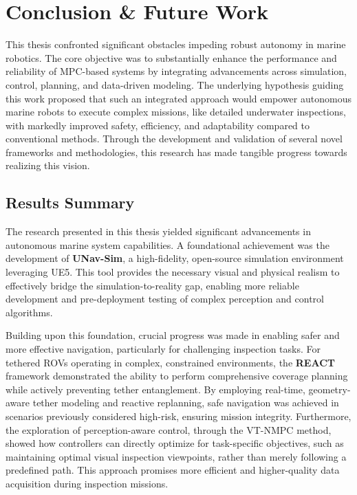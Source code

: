 \chapter{Conclusion \& Future Work}
This thesis confronted significant obstacles impeding robust autonomy in marine robotics. The core objective was to substantially enhance the performance and reliability of \ac{MPC}-based systems by integrating advancements across simulation, control, planning, and data-driven modeling. The underlying hypothesis guiding this work proposed that such an integrated approach would empower autonomous marine robots to execute complex missions, like detailed underwater inspections, with markedly improved safety, efficiency, and adaptability compared to conventional methods. Through the development and validation of several novel frameworks and methodologies, this research has made tangible progress towards realizing this vision.

\section{Results Summary}


\label{sec:summary_contributions}

The research presented in this thesis yielded significant advancements in autonomous marine system capabilities. A foundational achievement was the development of \textbf{UNav-Sim}, a high-fidelity, open-source simulation environment leveraging \ac{UE5}. This tool provides the necessary visual and physical realism to effectively bridge the simulation-to-reality gap, enabling more reliable development and pre-deployment testing of complex perception and control algorithms.

Building upon this foundation, crucial progress was made in enabling safer and more effective navigation, particularly for challenging inspection tasks. For tethered \acp{ROV} operating in complex, constrained environments, the \textbf{REACT} framework demonstrated the ability to perform comprehensive coverage planning while actively preventing tether entanglement. By employing real-time, geometry-aware tether modeling and reactive replanning, safe navigation was achieved in scenarios previously considered high-risk, ensuring mission integrity. Furthermore, the exploration of perception-aware control, through the VT-NMPC method, showed how controllers can directly optimize for task-specific objectives, such as maintaining optimal visual inspection viewpoints, rather than merely following a predefined path. This approach promises more efficient and higher-quality data acquisition during inspection missions.

